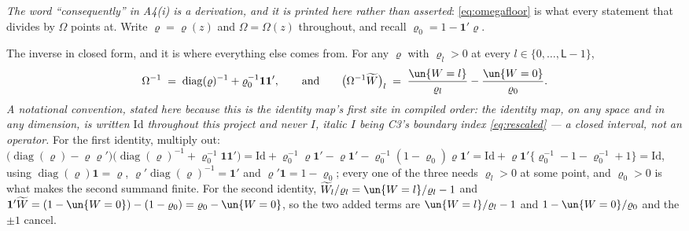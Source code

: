 \emph{The word ``consequently'' in A4(i) is a derivation, and it is printed here rather than asserted}:
\eqref{eq:omegafloor} is what every statement that divides by $\Omega$ points at. Write
$\varrho=\varrho(z)$ and $\Omega=\Omega(z)$ throughout, and recall $\varrho_0=1-\mathbf1'\varrho$.

The inverse in closed form, and it is where everything else comes from. For any
$\varrho$ with $\varrho_l>0$ at every $l\in\{0,\dots,\mathsf L-1\}$,
\begin{equation}\label{eq:omegainv}
\Omega^{-1}\;=\;\operatorname{diag}(\varrho)^{-1}+\varrho_0^{-1}\mathbf1\mathbf1' ,
\qquad\text{and}\qquad
\big(\Omega^{-1}\widetilde W\big)_l\;=\;\frac{\un\{W=l\}}{\varrho_l}-\frac{\un\{W=0\}}{\varrho_0} .
\end{equation}
\emph{A notational convention, stated here because this is the identity map's first site in compiled
order: the identity map, on any space and in any dimension, is written $\mathrm{Id}$ throughout this
project and never $I$, italic $I$ being C3's boundary index \eqref{eq:rescaled} --- a closed interval,
not an operator.} For the first identity, multiply out:
$\big(\operatorname{diag}(\varrho)-\varrho\varrho'\big)\big(\operatorname{diag}(\varrho)^{-1}+\varrho_0^{-1}\mathbf1\mathbf1'\big)
=\mathrm{Id}+\varrho_0^{-1}\varrho\mathbf1'-\varrho\mathbf1'-\varrho_0^{-1}(1-\varrho_0)\varrho\mathbf1'
=\mathrm{Id}+\varrho\mathbf1'\big\{\varrho_0^{-1}-1-\varrho_0^{-1}+1\big\}=\mathrm{Id}$,
using $\operatorname{diag}(\varrho)\mathbf1=\varrho$, $\varrho'\operatorname{diag}(\varrho)^{-1}=\mathbf1'$
and $\varrho'\mathbf1=1-\varrho_0$; every one of the three needs $\varrho_l>0$ at some point, and
$\varrho_0>0$ is what makes the second summand finite. For the
second identity, $\widetilde W_l/\varrho_l=\un\{W=l\}/\varrho_l-1$ and
$\mathbf1'\widetilde W=(1-\un\{W=0\})-(1-\varrho_0)=\varrho_0-\un\{W=0\}$, so the two added terms are
$\un\{W=l\}/\varrho_l-1$ and $1-\un\{W=0\}/\varrho_0$ and the $\pm1$ cancel.

